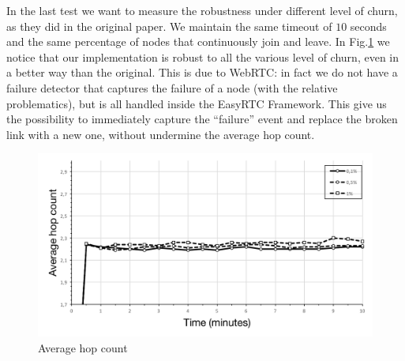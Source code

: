In the last test we want to measure the robustness under different level of churn, as they did in the original paper. We maintain the same timeout of $10$ seconds and the same percentage of nodes that continuously join and leave. In Fig.\ref{fig:average_hop_count_churn} we notice that our implementation is robust to all the various level of churn, even in a better way than the original. This is due to WebRTC: in fact we do not have a failure detector that captures the failure of a node (with the relative problematics), but is all handled inside the EasyRTC Framework. This give us the possibility to immediately capture the ``failure'' event and replace the broken link with a new one, without undermine the average hop count. 


\begin{figure}[ht]
  \centering
  \includegraphics[keepaspectratio=true, width=\textwidth]{images/average_hop_count_churn}\caption{Average hop count}
  \label{fig:average_hop_count_churn}
\end{figure}
